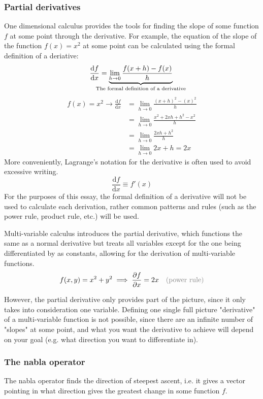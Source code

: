 \documentclass[a4paper, 12pt]{article} %
\newcommand{\justify}[1]{\text{\color{gray}(#1)}}
\newcommand{\der}[2]{\frac{\mathrm{d} #1}{\mathrm{d} #2}} %
\newcommand{\partialder}[2]{\frac{\partial #1}{\partial #2}} %
\begin{document}
\subsubsection{Partial derivatives}
One dimensional calculus provides the tools for finding the slope of some function $f$ at some point through the derivative. For example, the equation of the slope of the function $f(x)=x^2$ at some point can be calculated using the formal definition of a deriative:
\begin{equation}
	\der{f}{x}=\underbrace{\lim_{h\rightarrow0}\frac{f(x+h)-f(x)}{h}}_\text{\hidewidth The formal definition of a derivative\hidewidth}\\
\end{equation}
\begin{align*}
	f(x)=x^2\rightarrow\der{f}{x}&=\lim_{h\rightarrow0}\frac{(x+h)^2-(x)^2}{h}\\
	&=\lim_{h\rightarrow0}\frac{x^2+2xh+h^2-x^2}{h}\\
	&=\lim_{h\rightarrow0}\frac{2xh+h^2}{h}\\
	&=\lim_{h\rightarrow0}2x+h=2x
\end{align*}
More conveniently, Lagrange's notation for the derivative is often used to avoid excessive writing.
$$\der{f}{x}\equiv f'(x)$$
For the purposes of this essay, the formal definition of a derivative will not be used to calculate each derivation, rather common patterns and rules (such as the power rule, product rule, etc.) will be used. 

Multi-variable calculus introduces the partial derivative, which functions the same as a normal derivative but treats all variables except for the one being differentiated by as constants, allowing for the derivation of multi-variable functions.
\begin{align*}
	f(x,y)=x^2+y^2\implies\partialder{f}{x}=2x && \justify{power rule}
\end{align*}

However, the partial derivative only provides part of the picture, since it only takes into consideration one variable. Defining one single full picture "derivative" of a multi-variable function is not possible, since there are an infinite number of "slopes" at some point, and what you want the derivative to achieve will depend on your goal (e.g. what direction you want to differentiate in).

\subsubsection{The nabla operator}
The nabla operator finds the direction of steepest ascent, i.e. it gives a vector pointing in what direction gives the greatest change in some function $f$.
\end{document}

